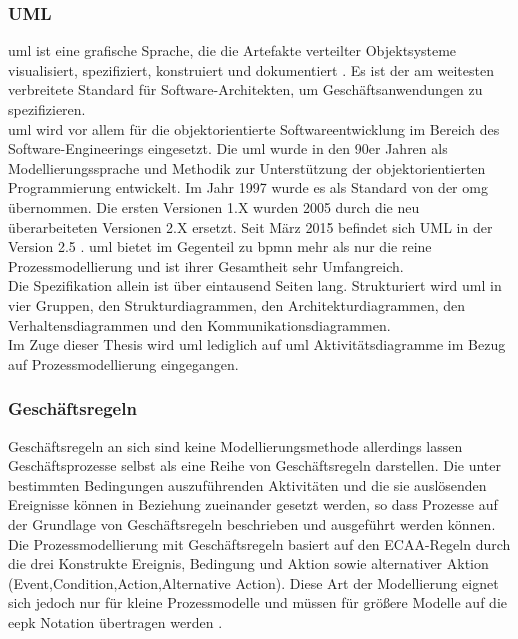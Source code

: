 \documentclass[a4paper, 12pt, twoside, headsepline=true]{scrartcl} %
\begin{document}
\subsubsection{UML}

 \ac{uml} ist eine grafische Sprache, die die Artefakte verteilter Objektsysteme visualisiert, spezifiziert, konstruiert und dokumentiert \cite{Kleuker}. Es ist der am weitesten verbreitete Standard für Software-Architekten, um Geschäftsanwendungen zu spezifizieren.\\
 \ac{uml} wird vor allem für die objektorientierte Softwareentwicklung im Bereich des Software-Engineerings eingesetzt.
Die \ac{uml} wurde in den 90er Jahren als Modellierungssprache und Methodik zur Unterstützung der objektorientierten Programmierung entwickelt. Im Jahr 1997 wurde es als Standard von der \ac{omg} übernommen. Die ersten Versionen 1.X wurden 2005 durch die neu überarbeiteten Versionen 2.X ersetzt. Seit März 2015 befindet sich UML in der Version 2.5 \cite{omguml}. \ac{uml} bietet im Gegenteil zu \ac{bpmn} mehr als nur die reine Prozessmodellierung und ist ihrer Gesamtheit sehr Umfangreich.\\
Die Spezifikation allein ist über eintausend Seiten lang. Strukturiert wird \ac{uml} in vier Gruppen, den  Strukturdiagrammen, den Architekturdiagrammen, den Verhaltensdiagrammen und den Kommunikationsdiagrammen. \\
Im Zuge dieser Thesis wird \ac{uml} lediglich auf \ac{uml} Aktivitätsdiagramme im Bezug auf Prozessmodellierung eingegangen.

\subsubsection{Geschäftsregeln}

Geschäftsregeln an sich sind keine Modellierungsmethode allerdings lassen Geschäftsprozesse selbst als eine Reihe von Geschäftsregeln darstellen. Die unter bestimmten Bedingungen auszuführenden Aktivitäten und die sie auslösenden Ereignisse können in Beziehung zueinander gesetzt werden, so dass Prozesse auf der Grundlage von Geschäftsregeln beschrieben und ausgeführt werden können.\\
Die Prozessmodellierung mit Geschäftsregeln basiert auf den  ECAA-Regeln durch die drei Konstrukte Ereignis, Bedingung und Aktion sowie alternativer Aktion (Event,Condition,Action,Alternative Action). Diese Art der Modellierung eignet sich jedoch nur für kleine Prozessmodelle und müssen für größere Modelle auf die \ac{eepk} Notation übertragen werden \cite{businessrules}. 
\end{document}
